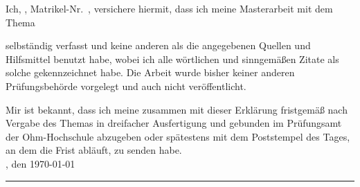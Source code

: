 
Ich, \autor, Matrikel-Nr.\ \matrikelnr, versichere hiermit, dass ich meine Masterarbeit mit dem Thema
\begin{quote}
\textit{\titel}
\end{quote}
selbständig verfasst und keine anderen als die angegebenen Quellen und Hilfsmittel benutzt habe, wobei ich alle wörtlichen und sinngemäßen Zitate als solche gekennzeichnet habe. Die Arbeit wurde bisher keiner anderen Prüfungsbehörde vorgelegt und auch nicht veröffentlicht.

Mir ist bekannt, dass ich meine \art zusammen mit dieser Erklärung fristgemäß nach Vergabe des Themas in dreifacher Ausfertigung und gebunden im Prüfungsamt der Ohm-Hochschule abzugeben oder spätestens mit dem Poststempel des Tages, an dem die Frist abläuft, zu senden habe.\\[6ex]

\ort, den \today


\rule[-0.2cm]{5cm}{0.5pt}

\textsc{\autor} 
